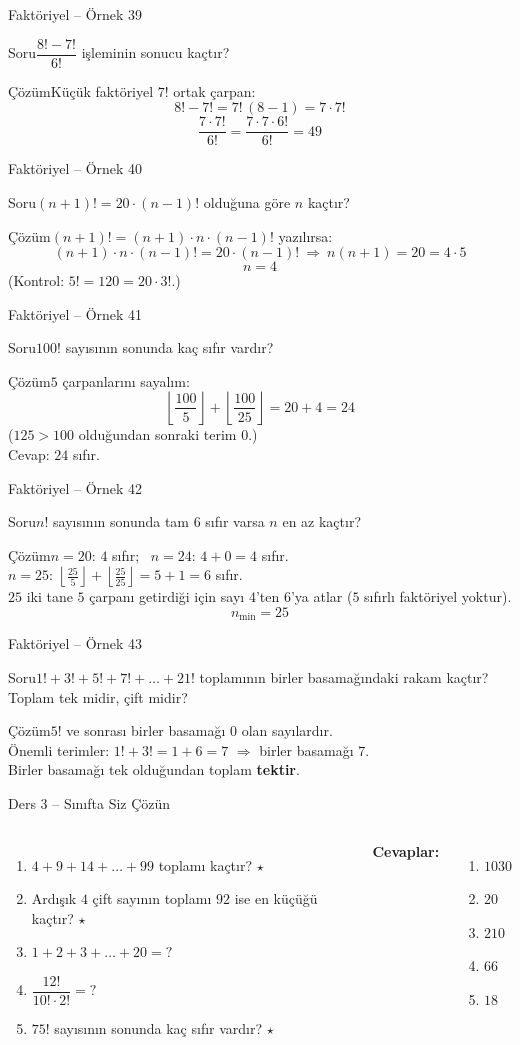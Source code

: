 \documentclass[aspectratio=169,11pt,handout]{beamer}
\newcommand{\soru}[3]{%
\begin{frame}{#1}
  \begin{block}{Soru}\large #2\end{block}
  \pause
  \begin{exampleblock}{Çözüm}\large #3\end{exampleblock}
\end{frame}}
\begin{document}
\soru{Faktöriyel -- Örnek 39}
{\(\dfrac{8!-7!}{6!}\) işleminin sonucu kaçtır?}
{Küçük faktöriyel \(7!\) ortak çarpan:
\[8!-7!=7!\,(8-1)=7\cdot 7!\]
\[\frac{7\cdot 7!}{6!}=\frac{7\cdot 7\cdot 6!}{6!}=49\]}

\soru{Faktöriyel -- Örnek 40}
{\((n+1)!=20\cdot(n-1)!\) olduğuna göre \(n\) kaçtır?}
{\((n+1)!=(n+1)\cdot n\cdot(n-1)!\) yazılırsa:
\[(n+1)\cdot n\cdot(n-1)!=20\cdot(n-1)!\ \Rightarrow\ n(n+1)=20=4\cdot 5\]
\[n=4\]
(Kontrol: \(5!=120=20\cdot 3!\).)}

\soru{Faktöriyel -- Örnek 41}
{\(100!\) sayısının sonunda kaç sıfır vardır?}
{\(5\) çarpanlarını sayalım:
\[\left\lfloor\frac{100}{5}\right\rfloor+\left\lfloor\frac{100}{25}\right\rfloor=20+4=24\]
(\(125>100\) olduğundan sonraki terim \(0\).)\\[3pt]
Cevap: \(24\) sıfır.}

\soru{Faktöriyel -- Örnek 42}
{\(n!\) sayısının sonunda tam \(6\) sıfır varsa \(n\) en az kaçtır?}
{\(n=20\): \(4\) sıfır; \ \(n=24\): \(4+0=4\) sıfır.\\[3pt]
\(n=25\): \(\left\lfloor\frac{25}{5}\right\rfloor+\left\lfloor\frac{25}{25}\right\rfloor=5+1=6\) sıfır.\\[3pt]
\(25\) iki tane \(5\) çarpanı getirdiği için sayı \(4\)'ten \(6\)'ya atlar (\(5\) sıfırlı faktöriyel yoktur).
\[n_{\min}=25\]}

\soru{Faktöriyel -- Örnek 43}
{\(1!+3!+5!+7!+\dots+21!\) toplamının birler basamağındaki rakam kaçtır? Toplam tek midir, çift midir?}
{\(5!\) ve sonrası birler basamağı \(0\) olan sayılardır.\\[3pt]
Önemli terimler: \(1!+3!=1+6=7\) \(\Rightarrow\) birler basamağı \(7\).\\[3pt]
Birler basamağı tek olduğundan toplam \textbf{tektir}.}

\begin{frame}{Ders 3 -- Sınıfta Siz Çözün}
\begin{columns}[t]
\begin{enumerate}
\item \(4+9+14+\dots+99\) toplamı kaçtır? \(\star\)
\item Ardışık \(4\) çift sayının toplamı \(92\) ise en küçüğü kaçtır? \(\star\)
\item \(1+2+3+\dots+20=?\)
\item \(\dfrac{12!}{10!\cdot 2!}=?\)
\item \(75!\) sayısının sonunda kaç sıfır vardır? \(\star\)
\end{enumerate}
\pause
\textbf{Cevaplar:}
\begin{enumerate}
\item \(1030\)
\item \(20\)
\item \(210\)
\item \(66\)
\item \(18\)
\end{enumerate}
\end{columns}
\vspace{4pt}{\footnotesize \(\star\) işaretli soruların adım adım çözümü sonraki slaytlardadır.}
\end{frame}
\end{document}
